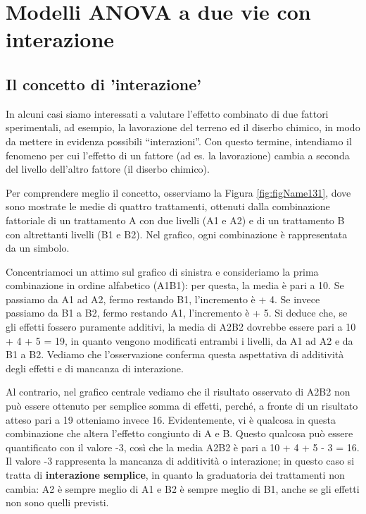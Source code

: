 \documentclass[a4paper,12pt,oneside]{book}
\begin{document}
\hypertarget{modelli-anova-a-due-vie-con-interazione}{%
\chapter{Modelli ANOVA a due vie con interazione}\label{modelli-anova-a-due-vie-con-interazione}}

\hypertarget{il-concetto-di-interazione}{%
\section{Il concetto di 'interazione'}\label{il-concetto-di-interazione}}

In alcuni casi siamo interessati a valutare l'effetto combinato di due fattori sperimentali, ad esempio, la lavorazione del terreno ed il diserbo chimico, in modo da mettere in evidenza possibili ``interazioni''. Con questo termine, intendiamo il fenomeno per cui l'effetto di un fattore (ad es. la lavorazione) cambia a seconda del livello dell'altro fattore (il diserbo chimico).

Per comprendere meglio il concetto, osserviamo la Figura \ref{fig:figName131}, dove sono mostrate le medie di quattro trattamenti, ottenuti dalla combinazione fattoriale di un trattamento A con due livelli (A1 e A2) e di un trattamento B con altrettanti livelli (B1 e B2). Nel grafico, ogni combinazione è rappresentata da un simbolo.

Concentriamoci un attimo sul grafico di sinistra e consideriamo la prima combinazione in ordine alfabetico (A1B1): per questa, la media è pari a 10. Se passiamo da A1 ad A2, fermo restando B1, l'incremento è + 4. Se invece passiamo da B1 a B2, fermo restando A1, l'incremento è + 5. Si deduce che, se gli effetti fossero puramente additivi, la media di A2B2 dovrebbe essere pari a 10 + 4 + 5 = 19, in quanto vengono modificati entrambi i livelli, da A1 ad A2 e da B1 a B2. Vediamo che l'osservazione conferma questa aspettativa di additività degli effetti e di mancanza di interazione.

Al contrario, nel grafico centrale vediamo che il risultato osservato di A2B2 non può essere ottenuto per semplice somma di effetti, perché, a fronte di un risultato atteso pari a 19 otteniamo invece 16. Evidentemente, vi è qualcosa in questa combinazione che altera l'effetto congiunto di A e B. Questo qualcosa può essere quantificato con il valore -3, così che la media A2B2 è pari a 10 + 4 + 5 - 3 = 16. Il valore -3 rappresenta la mancanza di additività o interazione; in questo caso si tratta di \textbf{interazione semplice}, in quanto la graduatoria dei trattamenti non cambia: A2 è sempre meglio di A1 e B2 è sempre meglio di B1, anche se gli effetti non sono quelli previsti.
\end{document}
